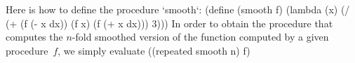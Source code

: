 Here is how to define the procedure `smooth`:
\begtt\scm 
(define (smooth f)
  (lambda (x)
    (/ (+ (f (- x dx)) (f x) (f (+ x dx)))
       3)))
\endtt
In order to obtain the procedure that computes the $n$-fold smoothed version of the function computed by a given procedure~$f$, we simply evaluate
\begtt\scm
((repeated smooth n) f)
\endtt
